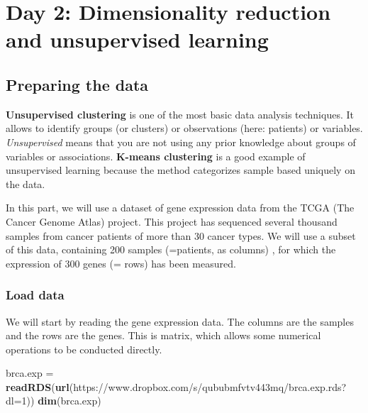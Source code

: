 \documentclass[
]{book}
\newenvironment{Shaded}{\begin{snugshade}}{\end{snugshade}}
\newcommand{\FunctionTok}[1]{\textcolor[rgb]{0.13,0.29,0.53}{\textbf{#1}}}
\newcommand{\NormalTok}[1]{#1}
\newcommand{\OtherTok}[1]{\textcolor[rgb]{0.56,0.35,0.01}{#1}}
\newcommand{\StringTok}[1]{\textcolor[rgb]{0.31,0.60,0.02}{#1}}
\begin{document}
\hypertarget{day-2-dimensionality-reduction-and-unsupervised-learning}{%
\section{Day 2: Dimensionality reduction and unsupervised learning}\label{day-2-dimensionality-reduction-and-unsupervised-learning}}

\hypertarget{preparing-the-data}{%
\subsection{Preparing the data}\label{preparing-the-data}}

\textbf{Unsupervised clustering} is one of the most basic data analysis techniques. It allows to identify groups (or clusters) or observations (here: patients) or variables. \emph{Unsupervised} means that you are not using any prior knowledge about groups of variables or associations. \textbf{K-means clustering} is a good example of unsupervised learning because the method categorizes sample based uniquely on the data.

In this part, we will use a dataset of gene expression data from the TCGA (The Cancer Genome Atlas) project. This project has sequenced several thousand samples from cancer patients of more than 30 cancer types. We will use a subset of this data, containing 200 samples (=patients, as columns) , for which the expression of 300 genes (= rows) has been measured.

\hypertarget{load-data}{%
\subsubsection{Load data}\label{load-data}}

We will start by reading the gene expression data. The columns are the samples and the rows are the genes. This is matrix, which allows some numerical operations to be conducted directly.

\begin{Shaded}
\begin{Highlighting}[]
\NormalTok{brca.exp }\OtherTok{=} \FunctionTok{readRDS}\NormalTok{(}\FunctionTok{url}\NormalTok{(}\StringTok{\textquotesingle{}https://www.dropbox.com/s/qububmfvtv443mq/brca.exp.rds?dl=1\textquotesingle{}}\NormalTok{))}
\FunctionTok{dim}\NormalTok{(brca.exp)}
\end{Highlighting}
\end{Shaded}
\end{document}
